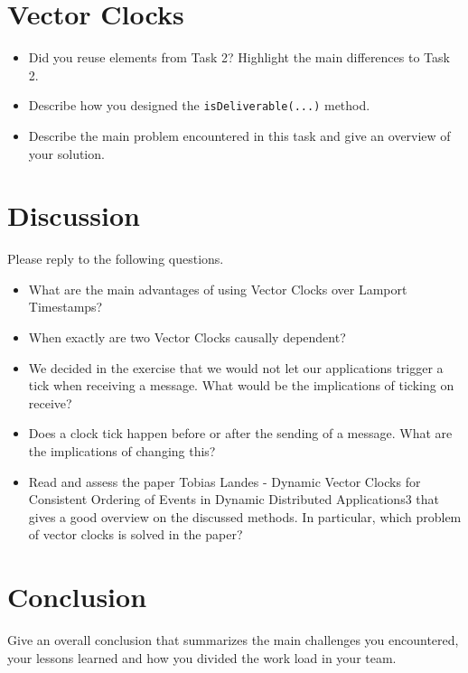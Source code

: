 \documentclass{report}
\begin{document}
\section{Vector Clocks}
\begin{itemize}
  \item Did you reuse elements from Task 2? Highlight the main differences to Task 2.
  \item Describe how you designed the \texttt{isDeliverable(...)} method.
  \item Describe the main problem encountered in this task and give an overview of your solution.
\end{itemize}

\section{Discussion}
Please reply to the following questions.
\begin{itemize}
  \item What are the main advantages of using Vector Clocks over Lamport Timestamps?
  \item When exactly are two Vector Clocks causally dependent?
  \item We decided in the exercise that we would not let our applications trigger a tick when receiving a message. What would be the implications of ticking on receive?
  \item Does a clock tick happen before or after the sending of a message. What are the implications of changing this?
  \item Read and assess the paper Tobias Landes - Dynamic Vector Clocks for Consistent Ordering of Events in Dynamic Distributed Applications3 that gives a good overview on the discussed methods. In particular, which problem of vector clocks is solved in the paper?
\end{itemize}


\section{Conclusion}

Give an overall conclusion that summarizes the main challenges you encountered, your lessons learned and how you divided the work load in your team.



\end{document}
